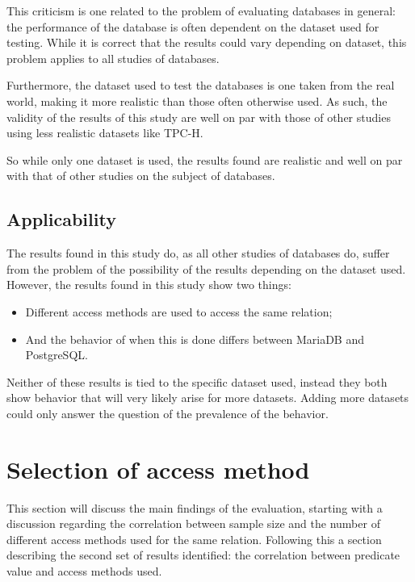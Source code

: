 This criticism is one related to the problem of evaluating databases in general:
the performance of the database is often dependent on the dataset used for
testing. While it is correct that the results could vary depending on dataset,
this problem applies to all studies of databases.

Furthermore, the dataset used to test the databases is one taken from the real
world, making it more realistic than those often otherwise used. As such, the
validity of the results of this study are well on par with those of other
studies using less realistic datasets like TPC-H.

So while only one dataset is used, the results found are realistic and well on
par with that of other studies on the subject of databases.

\subsection{Applicability}
The results found in this study do, as all other studies of databases do, suffer
from the problem of the possibility of the results depending on the dataset
used. However, the results found in this study show two things:
\begin{itemize}
\item Different access methods are used to access the same relation;
\item And the behavior of when this is done differs between MariaDB and
  PostgreSQL.\@
\end{itemize}

Neither of these results is tied to the specific dataset used, instead they
both show behavior that will very likely arise for more datasets. Adding more
datasets could only answer the question of the prevalence of the behavior.

\section{Selection of access method}\label{sec:accessmethods}
This section will discuss the main findings of the evaluation, starting with a
discussion regarding the correlation between sample size and the number of
different access methods used for the same relation. Following this a section
describing the second set of results identified: the correlation between
predicate value and access methods used.

